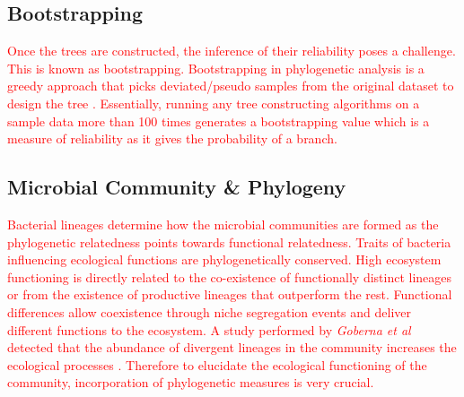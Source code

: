\subsection{Bootstrapping}

\textcolor{red}{Once the trees are constructed, the inference of their reliability poses a challenge. This is known as bootstrapping. Bootstrapping in phylogenetic analysis is a greedy approach that picks deviated/pseudo samples from the original dataset to design the tree \cite{lemoine_2018_renewing}. Essentially, running any tree constructing algorithms on a sample data more than 100 times generates a bootstrapping value which is a measure of reliability as it gives the probability of a branch.}

\subsection{Microbial Community \& Phylogeny}

\textcolor{red}{Bacterial lineages determine how the microbial communities are formed as the phylogenetic relatedness points towards functional relatedness. Traits of bacteria influencing ecological functions are phylogenetically conserved. High ecosystem functioning is directly related to the co-existence of functionally distinct lineages or from the existence of productive lineages that outperform the rest. Functional differences allow coexistence through niche segregation events and deliver different functions to the ecosystem. A study performed by \emph{Goberna et al} detected that the abundance of divergent lineages in the community increases the ecological processes \cite{goberna_2018_phylogeneticscale}. Therefore to elucidate the ecological functioning of the community, incorporation of phylogenetic measures is very crucial.}